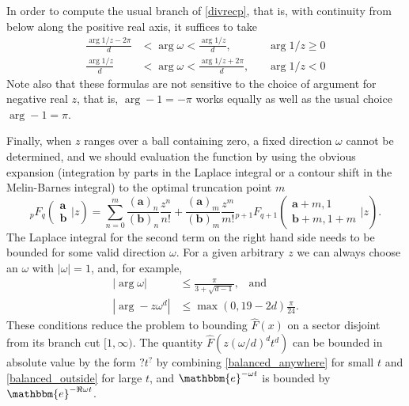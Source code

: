 \documentclass[12pt]{article}
\newcommand{\ee}[0] {\mathbbm{e}}
\numberwithin{equation}{section}
\newcommand{\FF}[6] {{}_{#1}{#2}_{#3} \left( \begin{array}{c} #4 \\ #5 \end{array} \Big| {#6}  \right)}
\begin{document}
In order to compute the usual branch of \eqref{divrecp}, that is, with continuity from below along the positive real axis, it suffices to take
\begin{equation*}
\begin{alignedat}{3}
\frac{\arg 1/z - 2\pi}{d} &< \arg \omega < \frac{\arg 1/z}{d} \text{,} \quad & \arg 1/z \ge 0\\
\frac{\arg 1/z}{d} &< \arg \omega < \frac{\arg 1/z + 2\pi}{d} \text{,} \quad & \arg 1/z < 0
\end{alignedat}
\end{equation*}
Note also that these formulas are not sensitive to the choice of argument for negative real $z$, that is, $\arg -1 = -\pi$ works equally as well as the usual choice $\arg -1 = \pi$.

Finally, when $z$ ranges over a ball containing zero, a fixed direction $\omega$ cannot be determined, and we should evaluation the function by using the obvious expansion (integration by parts in the Laplace integral or a contour shift in the Melin-Barnes integral) to the optimal truncation point $m$
\begin{equation*}
\FF{p}{F}{q}{\mathbf{a}}{\mathbf{b}}{z} = \sum_{n=0}^{m} \frac{(\mathbf{a})_n}{(\mathbf{b})_n} \frac{z^n}{n!} + \frac{(\mathbf{a})_m}{(\mathbf{b})_m} \frac{z^m}{m!} \FF{p+1}{F}{q+1}{\mathbf{a}+m,1}{\mathbf{b}+m,1+m}{z}\text{.}
\end{equation*}
The Laplace integral for the second term on the right hand side needs to be bounded for some valid direction $\omega$. For a given arbitrary $z$ we can always choose an $\omega$ with $|\omega|=1$, and, for example,
\begin{align*}
|\arg \omega| &\le \frac{\pi}{3+\sqrt{d-1}}\text{,} \quad \text{and}\\
|\arg -z \omega^d| &\le \max(0, 19 - 2d)\frac{\pi}{24}\text{.}
\end{align*}
These conditions reduce the problem to bounding $\hat{F}(x)$ on a sector disjoint from its branch cut $[1, \infty)$. The quantity $\hat{F}(z (\omega/d)^d t^d)$ can be bounded in absolute value by the form $? t^?$ by combining \eqref{balanced_anywhere} for small $t$ and \eqref{balanced_outside} for large $t$, and $\ee^{-\omega t}$ is bounded by $\ee^{- \Re \omega t}$.
\end{document}
